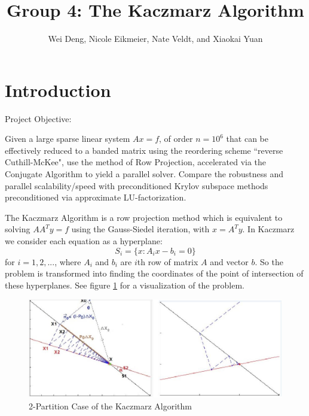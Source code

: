 \documentclass[a4paper,12pt]{article}
\begin{document}
\title{Group 4: The Kaczmarz Algorithm}
\author{Wei Deng, Nicole Eikmeier, Nate Veldt, and Xiaokai Yuan}
\maketitle{}


\section{Introduction}
Project Objective:

Given a large sparse linear system $Ax = f$, of order $n = 10^6$ that can be effectively reduced to a banded matrix using the reordering scheme ``reverse Cuthill-McKee", use the method of Row Projection, accelerated via the Conjugate Algorithm to yield a parallel solver. Compare the robustness and parallel scalability/speed with preconditioned Krylov subspace methods preconditioned via approximate LU-factorization.

\vspace{.2in}

The Kaczmarz Algorithm is a row projection method which is equivalent to solving $AA^Ty = f$ using the Gauss-Siedel iteration, with $x = A^Ty$. In Kaczmarz we consider each equation as a hyperplane:
$$S_i=\{x:A_ix-b_i=0\}$$ for $i=1,2,...$, where $A_i$ and $b_i$ are $i$th row of matrix $A$ and vector $b$. So the problem is transformed into finding the coordinates of the point of intersection of these hyperplanes.  See figure \ref{fig:ClassKacz} for a visualization of the problem.

\begin{figure}[htbp]
\begin{centering}
\includegraphics[width=5in]{Images/Classical_Kaczmarz}
\caption{2-Partition Case of the Kaczmarz Algorithm}
\label{fig:ClassKacz}
\end{centering}
\end{figure}
\end{document}
